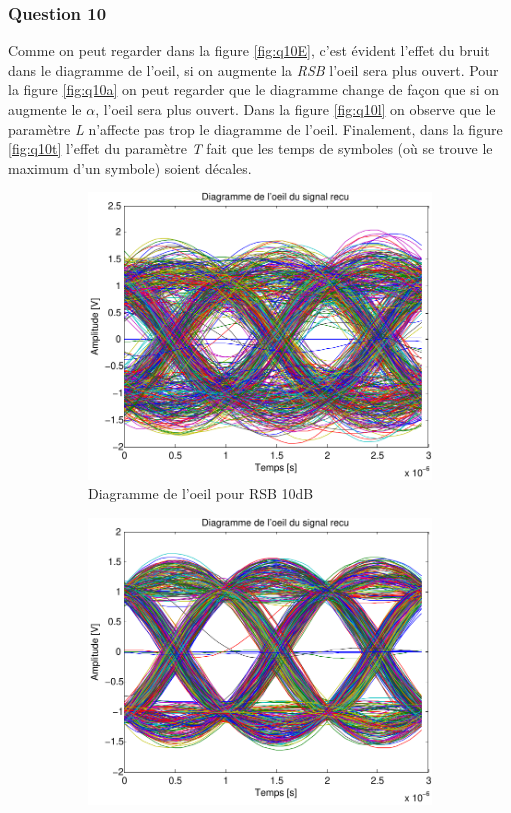 \documentclass[a4paper,11pt]{article}
\begin{document}
\subsubsection*{Question 10}
Comme on peut regarder dans la figure \ref{fig:q10E}, c'est évident l'effet du bruit dans le diagramme de l'oeil, si on augmente la \emph{RSB} l'oeil sera plus ouvert. Pour la figure \ref{fig:q10a} on peut regarder que le diagramme change de façon que si on augmente le $\alpha$, l'oeil sera plus ouvert. Dans la figure \ref{fig:q10l} on observe que le paramètre \emph{L} n'affecte pas trop le diagramme de l'oeil. Finalement, dans la figure \ref{fig:q10t} l'effet du paramètre \emph{T} fait que les temps de symboles (où se trouve le maximum d'un symbole) soient décales.
\begin{figure}
	\begin{subfigure}{.5\textwidth}
  		\centering
  		\includegraphics[width=1\linewidth]{Q10-EbNo10-crop.pdf}
  		\caption{Diagramme de l'oeil pour RSB 10dB}
  		\label{fig:q10E10}
	\end{subfigure}
	\begin{subfigure}{.5\textwidth}
  		\centering
  		\includegraphics[width=1\linewidth]{Q10-EbNo20-crop.pdf}

\end{subfigure}
\end{figure}
\end{document}
